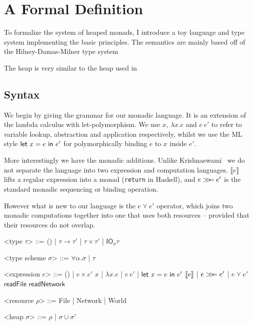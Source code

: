\chapter{A Formal Definition} \label{chapter:system}

To formalize the system of heaped monads, I introduce a toy language
and type system implementing the basic principles. The semantics are
mainly based off of the Hilney-Damas-Milner type system \cite{damasmilner}

The heap is very similar to the heap used in \cite{krishnaswami}

\section{Syntax}

\setlength{\grammarparsep}{20pt plus 1pt minus 1pt} %
\setlength{\grammarindent}{12em} %
\renewcommand{\syntleft}{}
\renewcommand{\syntright}{}


\def\defaultHypSeparation{\hskip .05in}

We begin by giving the grammar for our monadic language.
It is an extension of the lambda calculus with let-polymorphism.
We use $x$, $\lambda x . e$ and $e \ e'$ to refer to variable lookup,
abstraction and application respectively, whilst we use the ML style
$\mathsf{let} \ x = e \ \mathsf{in} \ e'$ for polymorphically binding $e$ to $x$ inside
$e'$.

More interestingly we have the monadic additions. Unlike
Krishnaswami~\cite{krishnaswami2006} we do not separate the language
into two expression and computation languages.
$\llbracket e \rrbracket$ lifts a regular expression into a monad (\texttt{return} in Haskell), and $e >\!\!>\!\!= e'$ is
the standard monadic sequencing or binding operation.

However what is new to our language is the $e \curlyvee e'$ operator, which
joins two monadic computations together into one that uses both
resources -- provided that their resources do not overlap.

\begin{grammar}

  <type $\tau$> ::= () | $\tau \rightarrow \tau'$ | $\tau \times \tau'$ | $\textsf{IO}_\sigma \tau$
  
  <type scheme $\sigma$> ::= $\forall \alpha . \sigma$ | $\tau$

  <expression $e$> ::= () | $e \times e'$
  \alt $x$ | $\lambda x . e$ | $e \ e'$ | $\mathsf{let} \ x = e \ \mathsf{in} \ e'$
  \alt $[\![ e]\!]$ | $e >\!\!>\!\!= e'$ | $e \curlyvee e'$
  \alt $\textsf{readFile}$
  \alt $\textsf{readNetwork}$

  <resource $\rho$> ::= \textsf{File} | \textsf{Network} | \textsf{World}

  <heap $\sigma$> ::= $\rho$ | $\sigma \cup \sigma'$

\end{grammar}

